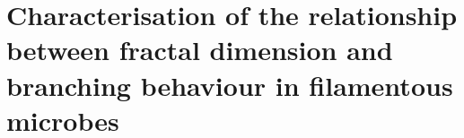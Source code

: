\documentclass[a4paper,12pt]{report}
\begin{document}
\setcounter{chapter}{6}

\chapter{Characterisation of the relationship between fractal dimension and branching behaviour in filamentous microbes}







\newpage
{}
{}



\end{document}
